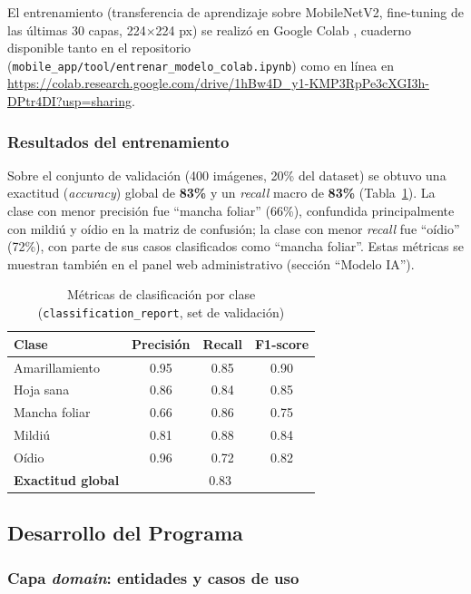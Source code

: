 \documentclass[12pt,a4paper]{article}
\begin{document}
El entrenamiento (transferencia de aprendizaje sobre MobileNetV2, fine-tuning
de las últimas 30 capas, 224$\times$224 px) se realizó en Google Colab
\cite{colabnotebook}, cuaderno disponible tanto en el repositorio
(\texttt{mobile\_app/tool/entrenar\_modelo\_colab.ipynb}) como en línea en
\url{https://colab.research.google.com/drive/1hBw4D_y1-KMP3RpPe3cXGI3h-DPtr4DI?usp=sharing}.

\subsubsection{Resultados del entrenamiento}

Sobre el conjunto de validación (400 imágenes, 20\% del dataset) se obtuvo una
exactitud (\textit{accuracy}) global de \textbf{83\%} y un \textit{recall}
macro de \textbf{83\%} (Tabla~\ref{tab:metricas}). La clase con menor precisión
fue ``mancha foliar'' (66\%), confundida principalmente con mildiú y oídio en
la matriz de confusión; la clase con menor \textit{recall} fue ``oídio''
(72\%), con parte de sus casos clasificados como ``mancha foliar''. Estas
métricas se muestran también en el panel web administrativo (sección
``Modelo IA'').

\begin{table}[H]
\centering
\caption{Métricas de clasificación por clase (\texttt{classification\_report}, set de validación)}
\label{tab:metricas}
\renewcommand{\arraystretch}{1.3}
\begin{tabular}{lccc}
\toprule
\bfseries Clase & \bfseries Precisión & \bfseries Recall & \bfseries F1-score \\
\midrule
Amarillamiento & 0.95 & 0.85 & 0.90 \\
Hoja sana      & 0.86 & 0.84 & 0.85 \\
Mancha foliar  & 0.66 & 0.86 & 0.75 \\
Mildiú         & 0.81 & 0.88 & 0.84 \\
Oídio          & 0.96 & 0.72 & 0.82 \\
\midrule
\textbf{Exactitud global} & \multicolumn{3}{c}{0.83} \\
\bottomrule
\end{tabular}
\end{table}

\subsection{Desarrollo del Programa}

\subsubsection{Capa \textit{domain}: entidades y casos de uso}
\end{document}
